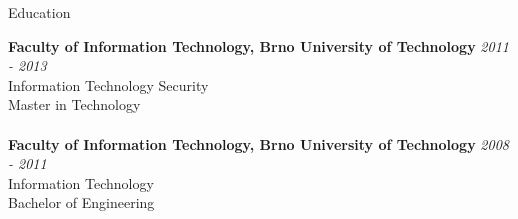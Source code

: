 \documentclass{cv} %
\begin{document}

\begin{rSection}{Education}

{\bf Faculty of Information Technology, Brno University of Technology} \hfill {\em 2011 - 2013} 
\\ Information Technology Security
\\ Master in Technology 
\\\\{\bf Faculty of Information Technology, Brno University of Technology} \hfill {\em 2008 - 2011} 
\\ Information Technology
\\ Bachelor of Engineering


\end{rSection}
\end{document}
